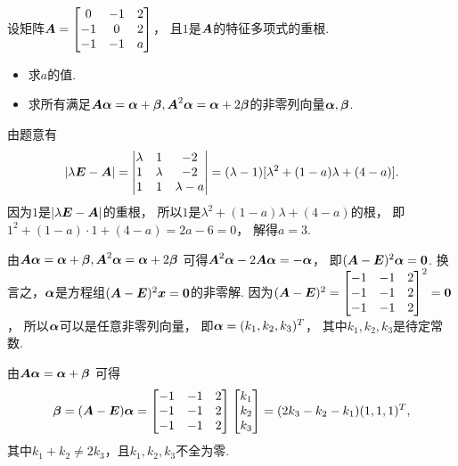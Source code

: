 \begin{example}
设矩阵\(\boldsymbol{A} = \begin{bmatrix}
	0 & -1 & 2 \\
	-1 & 0 & 2 \\
	-1 & -1 & a
\end{bmatrix}\)，
且\(1\)是\(\boldsymbol{A}\)的特征多项式的重根.
\begin{itemize}
	\item 求\(a\)的值.
	\item 求所有满足\(\boldsymbol{A} \boldsymbol\alpha = \boldsymbol\alpha + \boldsymbol\beta,
	\boldsymbol{A}^2 \boldsymbol\alpha = \boldsymbol\alpha + 2\boldsymbol\beta\)的非零列向量\(\boldsymbol\alpha,\boldsymbol\beta\).
\end{itemize}
\begin{solution}
由题意有\begin{equation*}
	\abs{\lambda\boldsymbol{E}-\boldsymbol{A}}
	= \begin{vmatrix}
		\lambda & 1 & -2 \\
		1 & \lambda & -2 \\
		1 & 1 & \lambda-a
	\end{vmatrix}
	= (\lambda-1)[\lambda^2+(1-a)\lambda+(4-a)].
\end{equation*}
因为\(1\)是\(\abs{\lambda\boldsymbol{E}-\boldsymbol{A}}\)的重根，
所以\(1\)是\(\lambda^2+(1-a)\lambda+(4-a)\)的根，
即\(1^2+(1-a)\cdot1+(4-a)
= 2a-6
= 0\)，
解得\(a=3\).

由\(\boldsymbol{A} \boldsymbol\alpha = \boldsymbol\alpha + \boldsymbol\beta,
\boldsymbol{A}^2 \boldsymbol\alpha = \boldsymbol\alpha + 2\boldsymbol\beta\)
可得\(\boldsymbol{A}^2 \boldsymbol\alpha - 2 \boldsymbol{A} \boldsymbol\alpha = -\boldsymbol\alpha\)，
即\((\boldsymbol{A}-\boldsymbol{E})^2 \boldsymbol\alpha = \boldsymbol0\).
换言之，\(\boldsymbol\alpha\)是方程组\((\boldsymbol{A}-\boldsymbol{E})^2 \boldsymbol{x} = \boldsymbol0\)的非零解.
因为\((\boldsymbol{A}-\boldsymbol{E})^2 = \begin{bmatrix}
	-1 & -1 & 2 \\
	-1 & -1 & 2 \\
	-1 & -1 & 2
\end{bmatrix}^2
= \boldsymbol0\)，
所以\(\boldsymbol\alpha\)可以是任意非零列向量，
即\(\boldsymbol\alpha = (k_1,k_2,k_3)^T\)，
其中\(k_1,k_2,k_3\)是待定常数.

由\(\boldsymbol{A} \boldsymbol\alpha = \boldsymbol\alpha + \boldsymbol\beta\)
可得\begin{equation*}
	\boldsymbol\beta = (\boldsymbol{A}-\boldsymbol{E}) \boldsymbol\alpha
	= \begin{bmatrix}
		-1 & -1 & 2 \\
		-1 & -1 & 2 \\
		-1 & -1 & 2
	\end{bmatrix}
	\begin{bmatrix}
		k_1 \\ k_2 \\ k_3
	\end{bmatrix}
	= (2k_3 - k_2 - k_1)
	(1,1,1)^T,
\end{equation*}
其中\(k_1 + k_2 \neq 2 k_3\)，且\(k_1,k_2,k_3\)不全为零.
\end{solution}
\end{example}

